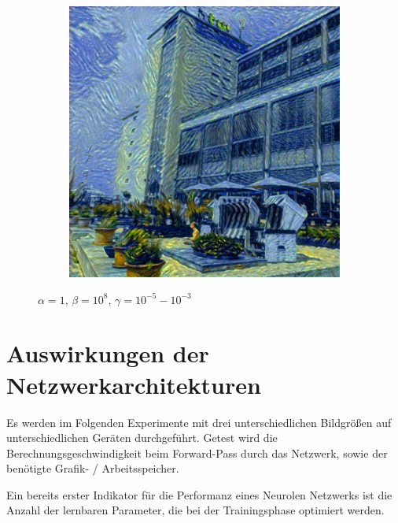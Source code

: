\begin{figure}[H]
\begin{subfigure}[h]{0.3\textwidth}
    \end{subfigure}
    \begin{subfigure}[h]{0.3\textwidth}
        \centering
        \includegraphics[width=\textwidth]{resources/content/output/neural-style/htw-test-1-6.jpg}
    \end{subfigure}
    \caption{$ \alpha = 1 $, $ \beta = 10^{8} $, $ \gamma = 10^{-5} - 10^{-3} $}
\end{figure}

\pagebreak

\section{Auswirkungen der Netzwerkarchitekturen}

Es werden im Folgenden Experimente mit drei unterschiedlichen Bildgrößen auf unterschiedlichen Geräten durchgeführt.
Getest wird die Berechnungsgeschwindigkeit beim Forward-Pass durch das Netzwerk, sowie der benötigte Grafik- / Arbeitsspeicher. 

Ein bereits erster Indikator für die Performanz eines Neurolen Netzwerks ist die Anzahl der lernbaren Parameter, die bei der Trainingsphase optimiert werden.


